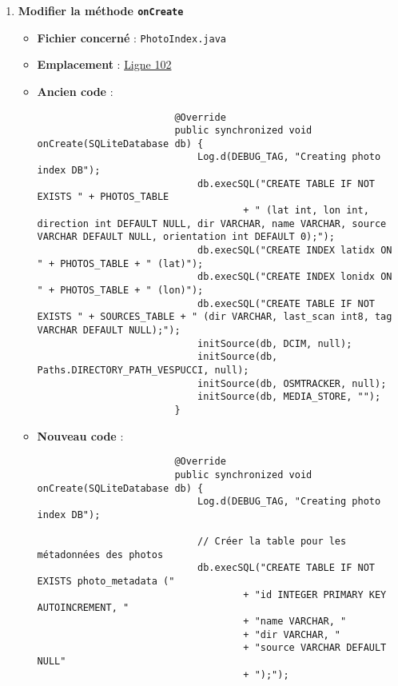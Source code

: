 \begin{enumerate}
    \item \textbf{Modifier la méthode \texttt{onCreate}}
          \begin{itemize}
              \item \textbf{Fichier concerné} : \texttt{PhotoIndex.java}
              \item \textbf{Emplacement} :
                    \href{https://github.com/MarcusWolschon/osmeditor4android/blob/master/src/main/java/de/blau/android/photos/PhotoIndex.java#L102 }{Ligne 102}
              \item \textbf{Ancien code} :
                    \begin{verbatim}
                        @Override
                        public synchronized void onCreate(SQLiteDatabase db) {
                            Log.d(DEBUG_TAG, "Creating photo index DB");
                            db.execSQL("CREATE TABLE IF NOT EXISTS " + PHOTOS_TABLE
                                    + " (lat int, lon int, direction int DEFAULT NULL, dir VARCHAR, name VARCHAR, source VARCHAR DEFAULT NULL, orientation int DEFAULT 0);");
                            db.execSQL("CREATE INDEX latidx ON " + PHOTOS_TABLE + " (lat)");
                            db.execSQL("CREATE INDEX lonidx ON " + PHOTOS_TABLE + " (lon)");
                            db.execSQL("CREATE TABLE IF NOT EXISTS " + SOURCES_TABLE + " (dir VARCHAR, last_scan int8, tag VARCHAR DEFAULT NULL);");
                            initSource(db, DCIM, null);
                            initSource(db, Paths.DIRECTORY_PATH_VESPUCCI, null);
                            initSource(db, OSMTRACKER, null);
                            initSource(db, MEDIA_STORE, "");
                        }
                    \end{verbatim}
              \item \textbf{Nouveau code} :
                    \begin{verbatim}
                        @Override
                        public synchronized void onCreate(SQLiteDatabase db) {
                            Log.d(DEBUG_TAG, "Creating photo index DB");

                            // Créer la table pour les métadonnées des photos
                            db.execSQL("CREATE TABLE IF NOT EXISTS photo_metadata ("
                                    + "id INTEGER PRIMARY KEY AUTOINCREMENT, "
                                    + "name VARCHAR, "
                                    + "dir VARCHAR, "
                                    + "source VARCHAR DEFAULT NULL"
                                    + ");");


\end{verbatim}
\end{itemize}
\end{enumerate}
